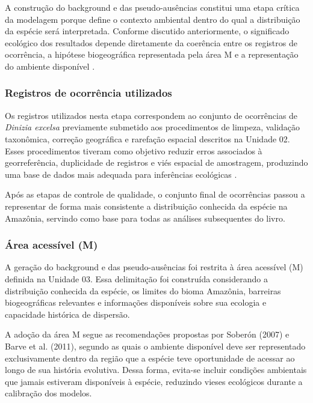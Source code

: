 A construção do background e das pseudo-ausências constitui uma etapa crítica da modelagem porque define o contexto ambiental dentro do qual a distribuição da espécie será interpretada. Conforme discutido anteriormente, o significado ecológico dos resultados depende diretamente da coerência entre os registros de ocorrência, a hipótese biogeográfica representada pela área M e a representação do ambiente disponível \citep{barve2011crucial}.

\subsubsection{Registros de ocorrência utilizados}

Os registros utilizados nesta etapa correspondem ao conjunto de ocorrências de \textit{Dinizia excelsa} previamente submetido aos procedimentos de limpeza, validação taxonômica, correção geográfica e rarefação espacial descritos na Unidade 02. Esses procedimentos tiveram como objetivo reduzir erros associados à georreferência, duplicidade de registros e viés espacial de amostragem, produzindo uma base de dados mais adequada para inferências ecológicas \citep{zizka2019coordinatecleaner}.

Após as etapas de controle de qualidade, o conjunto final de ocorrências passou a representar de forma mais consistente a distribuição conhecida da espécie na Amazônia, servindo como base para todas as análises subsequentes do livro.

\subsubsection{Área acessível (M)}

A geração do background e das pseudo-ausências foi restrita à área acessível (M) definida na Unidade 03. Essa delimitação foi construída considerando a distribuição conhecida da espécie, os limites do bioma Amazônia, barreiras biogeográficas relevantes e informações disponíveis sobre sua ecologia e capacidade histórica de dispersão.

A adoção da área M segue as recomendações propostas por Soberón (2007) e Barve et al. (2011), segundo as quais o ambiente disponível deve ser representado exclusivamente dentro da região que a espécie teve oportunidade de acessar ao longo de sua história evolutiva. Dessa forma, evita-se incluir condições ambientais que jamais estiveram disponíveis à espécie, reduzindo vieses ecológicos durante a calibração dos modelos.

